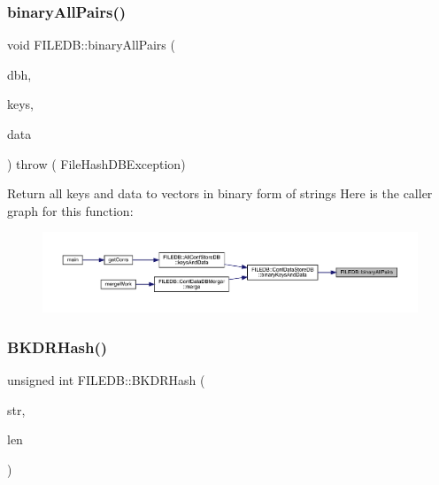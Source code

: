 \subsubsection{\texorpdfstring{binaryAllPairs()}{binaryAllPairs()}}
{\footnotesize\ttfamily void F\+I\+L\+E\+D\+B\+::binary\+All\+Pairs (\begin{DoxyParamCaption}\item[{\mbox{\hyperlink{adat-devel_2other__libs_2filedb_2filehash_2ffdb__db_8h_a0b27b956926453a7a8141ea8e10f0df8}{F\+F\+D\+B\+\_\+\+DB}} $\ast$}]{dbh,  }\item[{std\+::vector$<$ std\+::string $>$ \&}]{keys,  }\item[{std\+::vector$<$ std\+::string $>$ \&}]{data }\end{DoxyParamCaption}) throw ( File\+Hash\+D\+B\+Exception) }

Return all keys and data to vectors in binary form of strings Here is the caller graph for this function\+:
\nopagebreak
\begin{figure}[H]
\begin{center}
\leavevmode
\includegraphics[width=350pt]{d2/de6/namespaceFILEDB_ac242fd8f47258576482a692de8d1eaf3_icgraph}
\end{center}
\end{figure}
\mbox{\label{namespaceFILEDB_a06c984d24be338a8cfa3fcd1296914aa}} 
\subsubsection{\texorpdfstring{BKDRHash()}{BKDRHash()}}
{\footnotesize\ttfamily unsigned int F\+I\+L\+E\+D\+B\+::\+B\+K\+D\+R\+Hash (\begin{DoxyParamCaption}\item[{char $\ast$}]{str,  }\item[{unsigned int}]{len }\end{DoxyParamCaption})}

\mbox{\label{namespaceFILEDB_a81bebe16f4e0ccc238b04621af6ada41}} 
